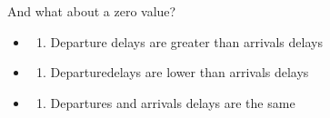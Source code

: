\documentclass[
  letterpaper,
  DIV=11,
  numbers=noendperiod]{scrartcl}
\providecommand{\tightlist}{%
  \setlength{\itemsep}{0pt}\setlength{\parskip}{0pt}}\usepackage{longtable,booktabs,array}
\begin{document}
\begin{tcolorbox}
And what about a zero value?

\begin{itemize}
\tightlist
\item
  \begin{enumerate}
  \def\labelenumi{(\Alph{enumi})}
  \tightlist
  \item
    Departure delays are greater than arrivals delays\\
  \end{enumerate}
\item
  \begin{enumerate}
  \def\labelenumi{(\Alph{enumi})}
  \setcounter{enumi}{1}
  \tightlist
  \item
    Departuredelays are lower than arrivals delays\\
  \end{enumerate}
\item
  \begin{enumerate}
  \def\labelenumi{(\Alph{enumi})}
  \setcounter{enumi}{2}
  \tightlist
  \item
    Departures and arrivals delays are the same
  \end{enumerate}
\end{itemize}

\end{tcolorbox}
\end{document}
